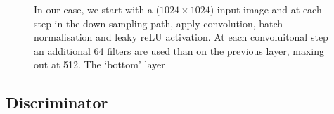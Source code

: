 \documentclass[11pt,a4paper,onecolumn]{report}
\begin{document}
  \begin{figure}[h]
    \centering
    \caption{
      In our case, we start with a ($1024\times 1024$) input image and at each step
      in the down sampling path, apply convolution, batch normalisation and leaky
      reLU activation.%
      At each convoluitonal step an additional 64 filters are used than on the
      previous layer, maxing out at 512. The `bottom' layer 
    }
    \label{fig:gen_model}
  \end{figure}


  


\subsection{Discriminator}
\end{document}
